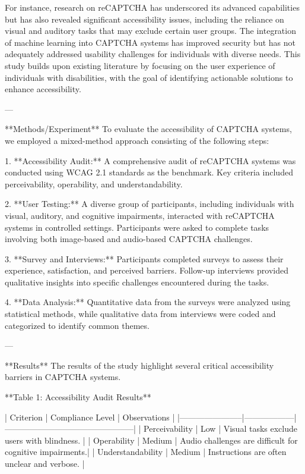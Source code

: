 For instance, research on reCAPTCHA has underscored its advanced capabilities but has also revealed significant accessibility issues, including the reliance on visual and auditory tasks that may exclude certain user groups. The integration of machine learning into CAPTCHA systems has improved security but has not adequately addressed usability challenges for individuals with diverse needs. This study builds upon existing literature by focusing on the user experience of individuals with disabilities, with the goal of identifying actionable solutions to enhance accessibility.  

---

**Methods/Experiment**  
To evaluate the accessibility of CAPTCHA systems, we employed a mixed-method approach consisting of the following steps:  

1. **Accessibility Audit:**  
   A comprehensive audit of reCAPTCHA systems was conducted using WCAG 2.1 standards as the benchmark. Key criteria included perceivability, operability, and understandability.  

2. **User Testing:**  
   A diverse group of participants, including individuals with visual, auditory, and cognitive impairments, interacted with reCAPTCHA systems in controlled settings. Participants were asked to complete tasks involving both image-based and audio-based CAPTCHA challenges.  

3. **Survey and Interviews:**  
   Participants completed surveys to assess their experience, satisfaction, and perceived barriers. Follow-up interviews provided qualitative insights into specific challenges encountered during the tasks.  

4. **Data Analysis:**  
   Quantitative data from the surveys were analyzed using statistical methods, while qualitative data from interviews were coded and categorized to identify common themes.  

---

**Results**  
The results of the study highlight several critical accessibility barriers in CAPTCHA systems.  

**Table 1: Accessibility Audit Results**  

| Criterion             | Compliance Level | Observations                                   |  
|-----------------------|------------------|-----------------------------------------------|  
| Perceivability        | Low              | Visual tasks exclude users with blindness.    |  
| Operability           | Medium           | Audio challenges are difficult for cognitive impairments.|  
| Understandability     | Medium           | Instructions are often unclear and verbose.   |  

